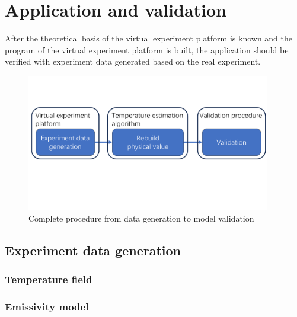 \chapter{Application and validation}

After the theoretical basis of the virtual experiment platform is known and 
the program of the virtual experiment platform is built, the application should be 
verified with experiment data generated based on the real experiment.

\begin{figure}[htbp]
    \includegraphics[width=0.95\textwidth]{figures/application_procedure.pdf}
    \caption{Complete procedure from data generation to model validation}
    \label{fig: application_procedure}
\end{figure}

\section{Experiment data generation}
\subsection{Temperature field}%
\subsection{Emissivity model}%
